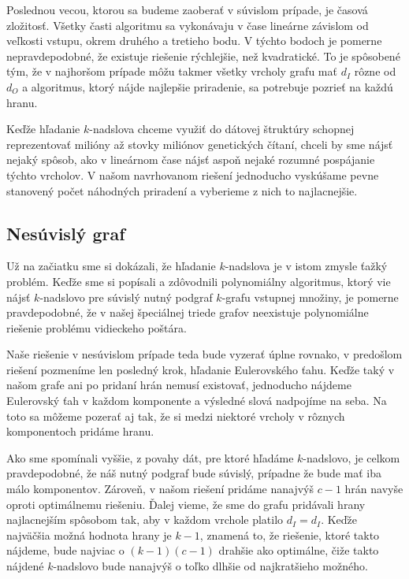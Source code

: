 Poslednou vecou, ktorou sa budeme zaoberať v súvislom prípade, je časová zložitosť. Všetky časti
algoritmu sa vykonávaju v čase lineárne závislom od veľkosti vstupu, okrem druhého a tretieho bodu.
V týchto bodoch je pomerne nepravdepodobné, že existuje riešenie rýchlejšie, než kvadratické. To je
spôsobené tým, že v najhoršom prípade môžu takmer všetky vrcholy grafu mať $d_I$ rôzne od $d_O$
a algoritmus, ktorý nájde najlepšie priradenie, sa potrebuje pozrieť na každú hranu.

Keďže hľadanie
$k$-nadslova chceme využiť do dátovej štruktúry schopnej reprezentovať milióny až stovky miliónov
genetických čítaní, chceli by sme nájsť nejaký spôsob, ako v lineárnom čase nájsť aspoň nejaké rozumné
pospájanie týchto vrcholov. V našom navrhovanom riešení jednoducho vyskúšame pevne stanovený počet
náhodných priradení a vyberieme z nich to najlacnejšie.

\subsection{Nesúvislý graf}

Už na začiatku sme si dokázali, že hľadanie $k$-nadslova je v istom zmysle ťažký problém. Keďže
sme si popísali a zdôvodnili polynomiálny algoritmus, ktorý vie nájsť $k$-nadslovo pre súvislý
nutný podgraf $k$-grafu vstupnej množiny, je pomerne pravdepodobné, že v našej špeciálnej
triede grafov neexistuje polynomiálne riešenie problému vidieckeho poštára.

Naše riešenie v nesúvislom prípade teda bude vyzerať úplne rovnako, v predošlom
riešení pozmeníme len posledný krok, hľadanie Eulerovského ťahu. Keďže taký v našom grafe
ani po pridaní hrán nemusí existovať, jednoducho nájdeme Eulerovský ťah v každom komponente
a výsledné slová nadpojíme na seba. Na toto sa môžeme pozerať aj tak, že si medzi niektoré
vrcholy v rôznych komponentoch pridáme hranu.

Ako sme spomínali vyššie, z povahy dát, pre ktoré hľadáme $k$-nadslovo,
je celkom pravdepodobné, že náš nutný podgraf bude súvislý, prípadne že bude mať iba málo
komponentov. Zároveň, v našom riešení pridáme nanajvýš $c - 1$ hrán navyše oproti
optimálnemu riešeniu. Ďalej vieme, že sme do grafu pridávali hrany najlacnejším spôsobom
tak, aby v každom vrchole platilo $d_I = d_I$. Keďže najväčšia možná hodnota
hrany je $k-1$, znamená to, že riešenie, ktoré takto nájdeme, bude najviac o $(k - 1)(c - 1)$ drahšie
ako optimálne, čiže takto nájdené $k$-nadslovo bude nanajvýš o toľko dlhšie od najkratšieho možného.

